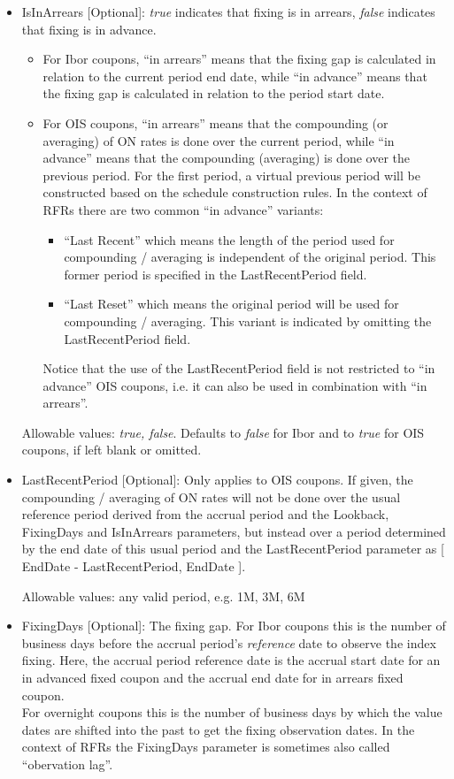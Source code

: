 \begin{itemize}
\item IsInArrears [Optional]: \emph{true} indicates that fixing is in arrears, \emph{false} indicates that fixing is in advance.
  \begin{itemize}
  \item For Ibor coupons, ``in arrears'' means that the fixing gap is calculated in relation to the current period end
    date, while ``in advance'' means that the fixing gap is calculated in relation to the period start date.
  \item For OIS coupons, ``in arrears'' means that the compounding (or averaging) of ON rates is done over the current
    period, while ``in advance'' means that the compounding (averaging) is done over the previous period. For the first
    period, a virtual previous period will be constructed based on the schedule construction rules. In the context of
    RFRs there are two common ``in advance'' variants:
    \begin{itemize}
    \item``Last Recent'' which means the length of the period used for compounding / averaging is independent of the
      original period. This former period is specified in the LastRecentPeriod field.
    \item ``Last Reset'' which means the original period will be used for compounding / averaging. This variant is
      indicated by omitting the LastRecentPeriod field.
    \end{itemize}
    Notice that the use of the LastRecentPeriod field is not restricted to ``in advance'' OIS coupons, i.e. it can also
    be used in combination with ``in arrears''.
  \end{itemize}

  Allowable values: \emph{true, false}. Defaults to \emph{false} for Ibor and to \emph{true} for OIS coupons, if left
  blank or omitted.

\item LastRecentPeriod [Optional]: Only applies to OIS coupons. If given, the compounding / averaging of ON rates will
  not be done over the usual reference period derived from the accrual period and the Lookback, FixingDays and
  IsInArrears parameters, but instead over a period determined by the end date of this usual period and the
  LastRecentPeriod parameter as [ EndDate - LastRecentPeriod, EndDate ].

  Allowable values: any valid period, e.g. 1M, 3M, 6M

\item FixingDays [Optional]: The fixing gap. For Ibor coupons this is the number of business days before the accrual
  period's {\em reference} date to observe the index fixing. Here, the accrual period reference date is the accrual
  start date for an in advanced fixed coupon and the accrual end date for in arrears fixed coupon. \\
  For overnight coupons this is the number of business days by which the value dates are shifted into the past to get
  the fixing observation dates. In the context of RFRs the FixingDays parameter is sometimes also called
  ``obervation lag''.


\end{itemize}

